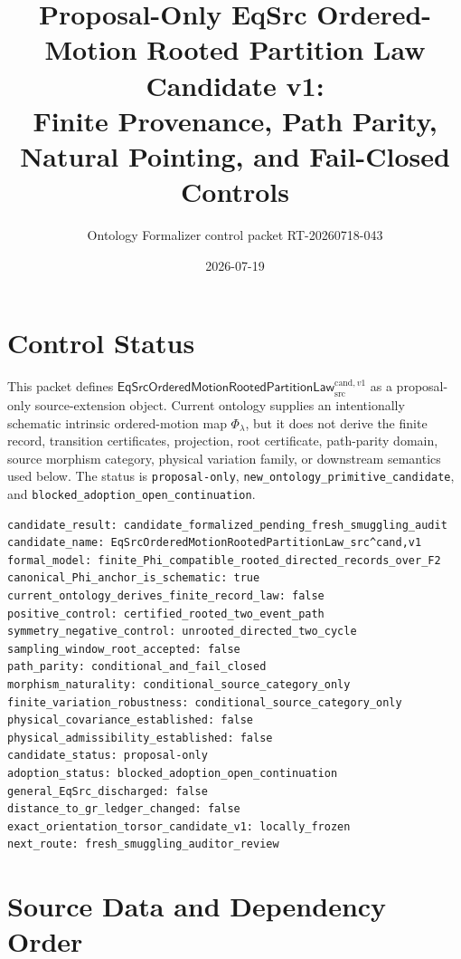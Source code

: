 \documentclass[11pt]{article}
\title{Proposal-Only EqSrc Ordered-Motion Rooted Partition Law Candidate v1:\\
Finite Provenance, Path Parity, Natural Pointing, and Fail-Closed Controls}
\author{Ontology Formalizer control packet RT-20260718-043}
\date{2026-07-19}
\newcommand{\RootLaw}{\mathsf{EqSrcOrderedMotionRootedPartitionLaw}^{\mathrm{cand},v1}_{\mathrm{src}}}
\begin{document}
\maketitle

\section{Control Status}

This packet defines \(\RootLaw\) as a proposal-only source-extension object.
Current ontology supplies an intentionally schematic intrinsic ordered-motion
map \(\Phi_\lambda\), but it does not derive the finite record, transition
certificates, projection, root certificate, path-parity domain, source
morphism category, physical variation family, or downstream semantics used
below. The status is \texttt{proposal-only},
\texttt{new\_ontology\_primitive\_candidate}, and
\texttt{blocked\_adoption\_open\_continuation}.

\begin{verbatim}
candidate_result: candidate_formalized_pending_fresh_smuggling_audit
candidate_name: EqSrcOrderedMotionRootedPartitionLaw_src^cand,v1
formal_model: finite_Phi_compatible_rooted_directed_records_over_F2
canonical_Phi_anchor_is_schematic: true
current_ontology_derives_finite_record_law: false
positive_control: certified_rooted_two_event_path
symmetry_negative_control: unrooted_directed_two_cycle
sampling_window_root_accepted: false
path_parity: conditional_and_fail_closed
morphism_naturality: conditional_source_category_only
finite_variation_robustness: conditional_source_category_only
physical_covariance_established: false
physical_admissibility_established: false
candidate_status: proposal-only
adoption_status: blocked_adoption_open_continuation
general_EqSrc_discharged: false
distance_to_gr_ledger_changed: false
exact_orientation_torsor_candidate_v1: locally_frozen
next_route: fresh_smuggling_auditor_review
\end{verbatim}

\section{Source Data and Dependency Order}
\end{document}
